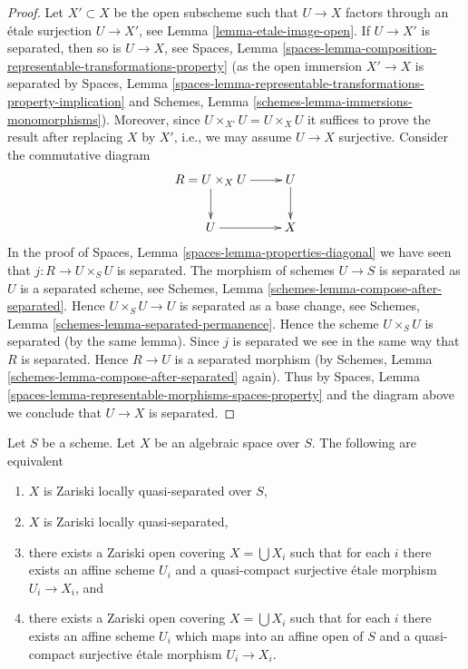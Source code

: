 \begin{proof}
Let $X' \subset X$ be the open subscheme such that $U \to X$ factors
through an \'etale surjection $U \to X'$, see
Lemma \ref{lemma-etale-image-open}.
If $U \to X'$ is separated, then so is $U \to X$, see
Spaces, Lemma
\ref{spaces-lemma-composition-representable-transformations-property}
(as the open immersion $X' \to X$ is separated by
Spaces, Lemma
\ref{spaces-lemma-representable-transformations-property-implication}
and
Schemes, Lemma \ref{schemes-lemma-immersions-monomorphisms}).
Moreover, since $U \times_{X'} U = U \times_X U$ it suffices
to prove the result after replacing $X$ by $X'$, i.e., we may
assume $U \to X$ surjective.
Consider the commutative diagram
$$
\xymatrix{
R = U \times_X U \ar[r] \ar[d] & U \ar[d] \\
U \ar[r] & X
}
$$
In the proof of
Spaces, Lemma \ref{spaces-lemma-properties-diagonal}
we have seen that $j : R \to U \times_S U$ is separated.
The morphism of schemes $U \to S$ is separated as $U$ is a separated
scheme, see
Schemes, Lemma \ref{schemes-lemma-compose-after-separated}.
Hence $U \times_S U \to U$ is separated as a base change, see
Schemes, Lemma \ref{schemes-lemma-separated-permanence}.
Hence the scheme $U \times_S U$ is separated (by the same lemma).
Since $j$ is separated we see in the same way that $R$ is separated.
Hence $R \to U$ is a separated morphism (by
Schemes, Lemma \ref{schemes-lemma-compose-after-separated}
again). Thus by
Spaces, Lemma \ref{spaces-lemma-representable-morphisms-spaces-property}
and the diagram above we conclude that $U \to X$ is separated.
\end{proof}

\begin{lemma}
\label{lemma-quasi-separated-quasi-compact-pieces}
Let $S$ be a scheme.
Let $X$ be an algebraic space over $S$.
The following are equivalent
\begin{enumerate}
\item $X$ is Zariski locally quasi-separated over $S$,
\item $X$ is Zariski locally quasi-separated,
\item there exists a Zariski open covering $X = \bigcup X_i$
such that for each $i$ there exists an affine scheme
$U_i$ and a quasi-compact surjective \'etale
morphism $U_i \to X_i$, and
\item there exists a Zariski open covering $X = \bigcup X_i$
such that for each $i$ there exists an affine scheme
$U_i$ which maps into an affine open of $S$ and a quasi-compact
surjective \'etale morphism $U_i \to X_i$.
\end{enumerate}
\end{lemma}

